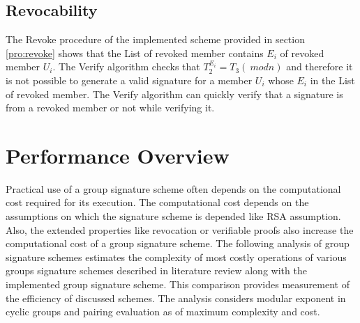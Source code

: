 \subsection{Revocability}
The Revoke procedure of the implemented scheme provided in section \ref{pro:revoke} shows that the List of revoked member contains $E_i$ of revoked member $U_i$. The Verify algorithm checks that $T_2^{E_i} = T_3 (~mod n)$ and therefore it is not possible to generate a valid signature for a member $U_i$ whose $E_i$ in the List of revoked member. The Verify algorithm can quickly verify that a signature is from a revoked member or not while verifying it.

\section{Performance Overview}
Practical use of a group signature scheme often depends on the computational cost required for its execution. The computational cost depends on the assumptions on which the signature scheme is depended like RSA assumption. Also, the extended properties like revocation or verifiable proofs also increase the computational cost of a group signature scheme. The following analysis of group signature schemes estimates the complexity of most costly operations of various groups signature schemes described in literature review along with the implemented group signature scheme. This comparison provides measurement of the efficiency of discussed schemes. The analysis considers modular exponent in cyclic groups and pairing evaluation as of maximum complexity and cost. 
